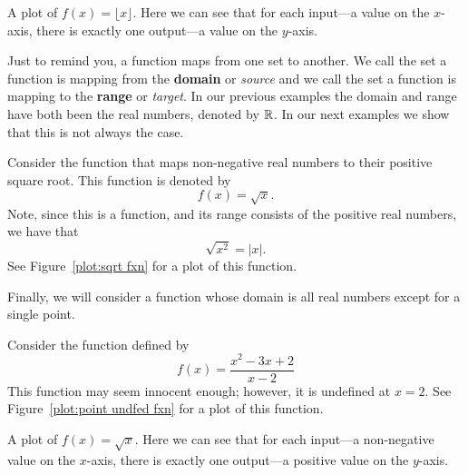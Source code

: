 \begin{marginfigure}[0in]
\caption{A plot of $f(x)=\lfloor x\rfloor$. Here we can see that for each input---a
  value on the $x$-axis, there is exactly one output---a value on the
  $y$-axis.}
\label{plot:greatest-integer fxn}
\end{marginfigure}


Just to remind you, a function maps from one set to another. We call
the set a function is mapping from the \textbf{domain}
or \textit{source} and we call the set a function is mapping to the
\textbf{range} or \textit{target}.  In our previous
examples the domain and range have both been the real numbers, denoted
by $\mathbb{R}$. In our next examples we show that this is not always the
case.


\begin{example}
Consider the function that maps non-negative real numbers to their positive square root. This function is denoted by 
\[
f(x) = \sqrt{x}.
\]
Note, since this is a function, and its range consists of the positive real numbers, we have that 
\[
\sqrt{x^2} = |x|.
\]
See Figure~\ref{plot:sqrt fxn} for a plot of this
function.
\end{example}

Finally, we will consider a function whose domain is all real numbers
except for a single point.

\begin{example}
Consider the function defined by 
\[
f(x) = \frac{x^2 - 3x + 2}{x-2}
\]
This function may seem innocent enough; however, it is undefined at
$x=2$. See Figure~\ref{plot:point undfed fxn} for a plot of this function.
\end{example}

\begin{marginfigure}[0in]
\caption{A plot of $f(x)=\sqrt{x}$. Here we can see that for each
  input---a non-negative value on the $x$-axis, there is exactly one
  output---a positive value on the $y$-axis.}
\label{plot:sqrt fxn}
\end{marginfigure}


